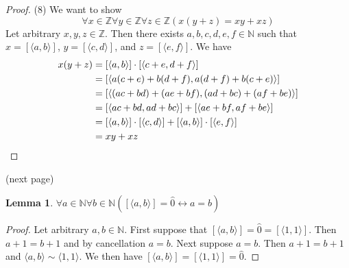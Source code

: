 \documentclass{report}
\newtheorem{lemma}[theo]{Lemma}
\begin{document}
\begin{proof}(8)
We want to show
\begin{equation*}
\forall x\in\mathbb Z\forall y\in\mathbb Z\forall z\in\mathbb Z(x(y+z)=xy+xz)
\end{equation*}
Let arbitrary $x,y,z\in\mathbb Z$. Then there exists $a,b,c,d,e,f\in\mathbb N$ such that 
$x=[\langle a,b\rangle]$, $y=[\langle c,d\rangle]$, and $z=[\langle e,f\rangle]$.
We have
\begin{align*}
x(y+z)&=[\langle a,b\rangle]\cdot[\langle c+e,d+f\rangle]\\
&=[\langle a(c+e)+b(d+f),a(d+f)+b(c+e)\rangle]\\
&=[\langle (ac+bd)+(ae+bf),(ad+bc)+(af+be)\rangle]\\
&=[\langle ac+bd,ad+bc\rangle]+[\langle ae+bf,af+be\rangle]\\
&=[\langle a,b\rangle]\cdot[\langle c,d\rangle]+[\langle a,b\rangle]\cdot[\langle e,f\rangle]\\
&=xy+xz\qedhere
\end{align*}
\end{proof}
\noindent(next page)\newpage
\begin{lemma}
$\forall a\in\mathbb N\forall b\in\mathbb N([\langle a,b\rangle]=\hat0\leftrightarrow a=b)$
\end{lemma}
\begin{proof}
Let arbitrary $a,b\in\mathbb N$. First suppose that $[\langle a,b\rangle]=\hat0=[\langle 1,1\rangle]$. Then $a+1=b+1$ and by cancellation $a=b$. Next suppose 
$a=b$. Then $a+1=b+1$ and $\langle a,b\rangle\sim\langle 1,1\rangle$. We then have
$[\langle a,b\rangle]=[\langle 1,1\rangle]=\hat0$.
\end{proof}
\end{document}
